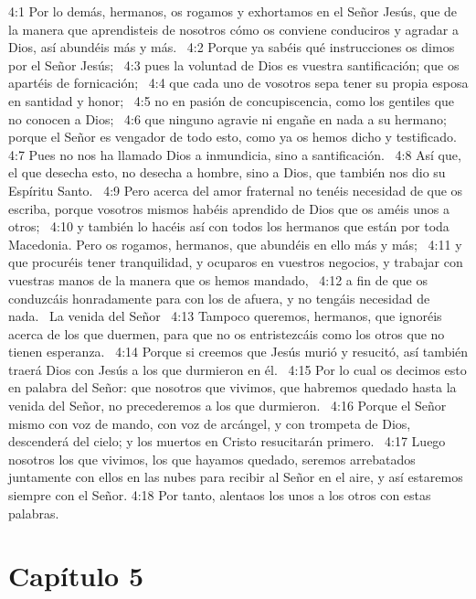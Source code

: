 4:1 Por lo demás, hermanos, os rogamos y exhortamos en el Señor Jesús, que de la manera que aprendisteis de nosotros cómo os conviene conduciros y agradar a Dios, así abundéis más y más.  
4:2 Porque ya sabéis qué instrucciones os dimos por el Señor Jesús;  
4:3 pues la voluntad de Dios es vuestra santificación; que os apartéis de fornicación;  
4:4 que cada uno de vosotros sepa tener su propia esposa en santidad y honor;  
4:5 no en pasión de concupiscencia, como los gentiles que no conocen a Dios;  
4:6 que ninguno agravie ni engañe en nada a su hermano; porque el Señor es vengador de todo esto, como ya os hemos dicho y testificado.  
4:7 Pues no nos ha llamado Dios a inmundicia, sino a santificación.  
4:8 Así que, el que desecha esto, no desecha a hombre, sino a Dios, que también nos dio su Espíritu Santo.  
4:9 Pero acerca del amor fraternal no tenéis necesidad de que os escriba, porque vosotros mismos habéis aprendido de Dios que os améis unos a otros;  
4:10 y también lo hacéis así con todos los hermanos que están por toda Macedonia. Pero os rogamos, hermanos, que abundéis en ello más y más;  
4:11 y que procuréis tener tranquilidad, y ocuparos en vuestros negocios, y trabajar con vuestras manos de la manera que os hemos mandado,  
4:12 a fin de que os conduzcáis honradamente para con los de afuera, y no tengáis necesidad de nada.  
La venida del Señor  
4:13 Tampoco queremos, hermanos, que ignoréis acerca de los que duermen, para que no os entristezcáis como los otros que no tienen esperanza.  
4:14 Porque si creemos que Jesús murió y resucitó, así también traerá Dios con Jesús a los que durmieron en él.  
4:15 Por lo cual os decimos esto en palabra del Señor: que nosotros que vivimos, que habremos quedado hasta la venida del Señor, no precederemos a los que durmieron.  
4:16 Porque el Señor mismo con voz de mando, con voz de arcángel, y con trompeta de Dios, descenderá del cielo; y los muertos en Cristo resucitarán primero.  
4:17 Luego nosotros los que vivimos, los que hayamos quedado, seremos arrebatados juntamente con ellos en las nubes para recibir al Señor en el aire, y así estaremos siempre con el Señor. 
4:18 Por tanto, alentaos los unos a los otros con estas palabras.  
\section*{Capítulo 5 }

